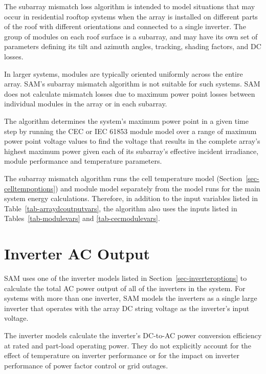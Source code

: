 \documentclass[12pt,letterpaper]{article}
\begin{document}
The subarray mismatch loss algorithm \citep{dobos2012b} is intended to model situations that may occur in residential rooftop systems when the array is installed on different parts of the roof with different orientations and connected to a single inverter. The group of modules on each roof surface is a subarray, and may have its own set of parameters defining its tilt and azimuth angles, tracking, shading factors, and DC losses. 

In larger systems, modules are typically oriented uniformly across the entire array. SAM's subarray mismatch algorithm is not suitable for such systems. SAM does not calculate mismatch losses due to maximum power point losses between individual modules in the array or in each subarray.

The algorithm determines the system's maximum power point in a given time step by running the CEC or IEC 61853 module model over a range of maximum power point voltage values to find the voltage that results in the complete array's highest maximum power given each of its subarray's effective incident irradiance, module performance and temperature parameters.

The subarray mismatch algorithm runs the cell temperature model (Section~\ref{sec-celltempoptions}) and module model separately from the model runs for the main system energy calculations. Therefore, in addition to the input variables listed in Table~\ref{tab-arraydcoutputvars}, the algorithm also uses the inputs listed in Tables~\ref{tab-modulevars} and \ref{tab-cecmodulevars}.

\chapter{Inverter AC Output}\label{sec-inverter}

SAM uses one of the inverter models listed in Section~\ref{sec-inverteroptions} to calculate the total AC power output of all of the inverters in the system. For systems with more than one inverter, SAM models the inverters as a single large inverter that operates with the array DC string voltage as the inverter's input voltage. 

The inverter models calculate the inverter's DC-to-AC power conversion efficiency at rated and part-load operating power. They do not explicitly account for the effect of temperature on inverter performance or for the impact on inverter performance of power factor control or grid outages. 
\end{document}

